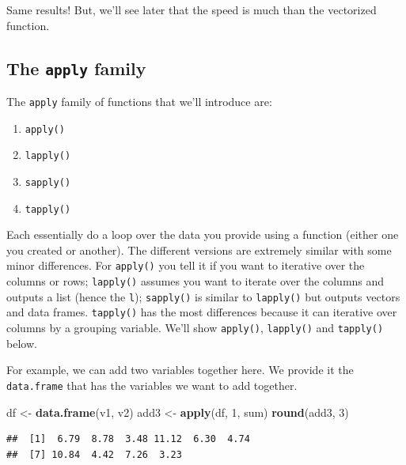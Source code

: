 \documentclass[]{tufte-book}
\newenvironment{Shaded}{}{}
\newcommand{\KeywordTok}[1]{\textcolor[rgb]{0.00,0.44,0.13}{\textbf{#1}}}
\newcommand{\DecValTok}[1]{\textcolor[rgb]{0.25,0.63,0.44}{#1}}
\newcommand{\StringTok}[1]{\textcolor[rgb]{0.25,0.44,0.63}{#1}}
\newcommand{\NormalTok}[1]{#1}
\providecommand{\tightlist}{%
  \setlength{\itemsep}{0pt}\setlength{\parskip}{0pt}}
\theoremstyle{definition}
\theoremstyle{definition}
\theoremstyle{remark}
\begin{document}
Same results! But, we'll see later that the speed is much than the
vectorized function.

\subsection*{\texorpdfstring{The \texttt{apply}
family}{The apply family}}\label{the-apply-family}

The \texttt{apply} family of functions that we'll introduce are:

\begin{enumerate}
\def\labelenumi{\arabic{enumi}.}
\tightlist
\item
  \texttt{apply()}
\item
  \texttt{lapply()}
\item
  \texttt{sapply()}
\item
  \texttt{tapply()}
\end{enumerate}

Each essentially do a loop over the data you provide using a function
(either one you created or another). The different versions are
extremely similar with some minor differences. For \texttt{apply()} you
tell it if you want to iterative over the columns or rows;
\texttt{lapply()} assumes you want to iterate over the columns and
outputs a list (hence the \texttt{l}); \texttt{sapply()} is similar to
\texttt{lapply()} but outputs vectors and data frames. \texttt{tapply()}
has the most differences because it can iterative over columns by a
grouping variable. We'll show \texttt{apply()}, \texttt{lapply()} and
\texttt{tapply()} below.

For example, we can add two variables together here. We provide it the
\texttt{data.frame} that has the variables we want to add together.

\begin{Shaded}
\begin{Highlighting}[]
\NormalTok{df <-}\StringTok{ }\KeywordTok{data.frame}\NormalTok{(v1, v2)}
\NormalTok{add3 <-}\StringTok{ }\KeywordTok{apply}\NormalTok{(df, }\DecValTok{1}\NormalTok{, sum)}
\KeywordTok{round}\NormalTok{(add3, }\DecValTok{3}\NormalTok{)}
\end{Highlighting}
\end{Shaded}

\begin{verbatim}
##  [1]  6.79  8.78  3.48 11.12  6.30  4.74
##  [7] 10.84  4.42  7.26  3.23
\end{verbatim}
\end{document}
